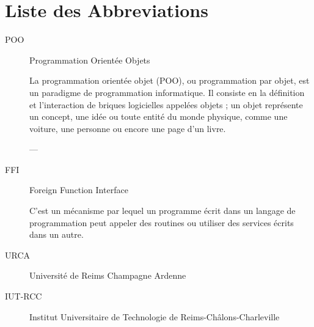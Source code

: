 \documentclass[11pt,a4paper,krantz2,11pt,oneside]{krantz}
\begin{document}
\hypertarget{liste-des-abbreviations}{%
\chapter*{Liste des Abbreviations}\label{liste-des-abbreviations}}


\begin{description}
\item[POO]
Programmation Orientée Objets

La programmation orientée objet (POO), ou programmation par objet, est un paradigme de programmation informatique. Il consiste en la définition et l'interaction de briques logicielles appelées objets ; un objet représente un concept, une idée ou toute entité du monde physique, comme une voiture, une personne ou encore une page d'un livre.

--- \citep{wikipedia_programmation_2020}
\item[FFI]
Foreign Function Interface

C'est un mécanisme par lequel un programme écrit dans un langage de programmation peut appeler des routines ou utiliser des services écrits dans un autre.
\item[URCA]
Université de Reims Champagne Ardenne
\item[IUT-RCC]
Institut Universitaire de Technologie de Reims-Châlons-Charleville
\end{description}

\backmatter



\printindex
\end{document}
